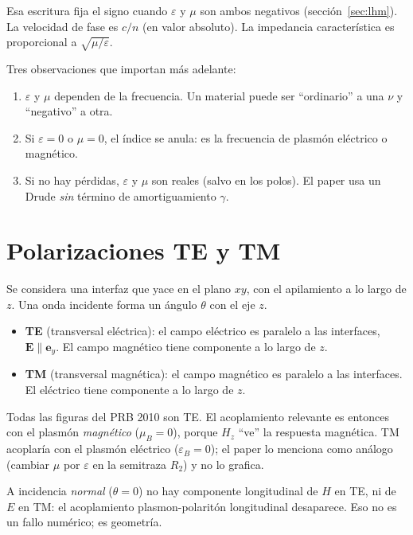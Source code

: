 \documentclass[11pt,a4paper]{article}
\begin{document}
Esa escritura fija el signo cuando \(\varepsilon\) y \(\mu\) son ambos
negativos (sección~\ref{sec:lhm}).
La velocidad de fase es \(c/n\) (en valor absoluto).
La impedancia característica es proporcional a \(\sqrt{\mu/\varepsilon}\).

Tres observaciones que importan más adelante:

\begin{enumerate}
\item \(\varepsilon\) y \(\mu\) dependen de la frecuencia. Un material puede
ser ``ordinario'' a una \(\nu\) y ``negativo'' a otra.
\item Si \(\varepsilon=0\) o \(\mu=0\), el índice se anula: es la frecuencia de
plasmón eléctrico o magnético.
\item Si no hay pérdidas, \(\varepsilon\) y \(\mu\) son reales (salvo en los
polos). El paper usa un Drude \emph{sin} término de amortiguamiento \(\gamma\).
\end{enumerate}

\section{Polarizaciones TE y TM}

Se considera una interfaz que yace en el plano \(xy\), con el apilamiento a lo
largo de \(z\). Una onda incidente forma un ángulo \(\theta\) con el eje \(z\).

\begin{itemize}
\item \textbf{TE} (transversal eléctrica): el campo eléctrico es paralelo a las
interfaces, \(\mathbf{E}\parallel\mathbf{e}_y\). El campo magnético tiene
componente a lo largo de \(z\).
\item \textbf{TM} (transversal magnética): el campo magnético es paralelo a las
interfaces. El eléctrico tiene componente a lo largo de \(z\).
\end{itemize}

Todas las figuras del PRB 2010 son TE.
El acoplamiento relevante es entonces con el plasmón \emph{magnético}
(\(\mu_B=0\)), porque \(H_z\) ``ve'' la respuesta magnética.
TM acoplaría con el plasmón eléctrico (\(\varepsilon_B=0\)); el paper lo
menciona como análogo (cambiar \(\mu\) por \(\varepsilon\) en la semitraza
\(R_2\)) y no lo grafica.

A incidencia \emph{normal} (\(\theta=0\)) no hay componente longitudinal de
\(H\) en TE, ni de \(E\) en TM: el acoplamiento plasmon-polaritón longitudinal
desaparece. Eso no es un fallo numérico; es geometría.
\end{document}
